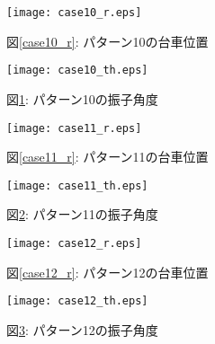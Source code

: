 \begin{figure}[htbp]
    \begin{minipage}{0.5\hsize}
        \begin{center}
            \texttt{[image: case10\_r.eps]}
            \caption{図\ref{case10_r}: パターン10の台車位置}
            \label{case10_r}
        \end{center}
    \end{minipage}
    \begin{minipage}{0.5\hsize}
        \begin{center}
            \texttt{[image: case10\_th.eps]}
            \caption{図\ref{case10_th}: パターン10の振子角度}
            \label{case10_th}
        \end{center}
    \end{minipage}
\end{figure}

\begin{figure}[htbp]
    \begin{minipage}{0.5\hsize}
        \begin{center}
            \texttt{[image: case11\_r.eps]}
            \caption{図\ref{case11_r}: パターン11の台車位置}
            \label{case11_r}
        \end{center}
    \end{minipage}
    \begin{minipage}{0.5\hsize}
        \begin{center}
            \texttt{[image: case11\_th.eps]}
            \caption{図\ref{case11_th}: パターン11の振子角度}
            \label{case11_th}
        \end{center}
    \end{minipage}
\end{figure}

\begin{figure}[htbp]
    \begin{minipage}{0.5\hsize}
        \begin{center}
            \texttt{[image: case12\_r.eps]}
            \caption{図\ref{case12_r}: パターン12の台車位置}
            \label{case12_r}
        \end{center}
    \end{minipage}
    \begin{minipage}{0.5\hsize}
        \begin{center}
            \texttt{[image: case12\_th.eps]}
            \caption{図\ref{case12_th}: パターン12の振子角度}
            \label{case12_th}
        \end{center}
    \end{minipage}
\end{figure}

